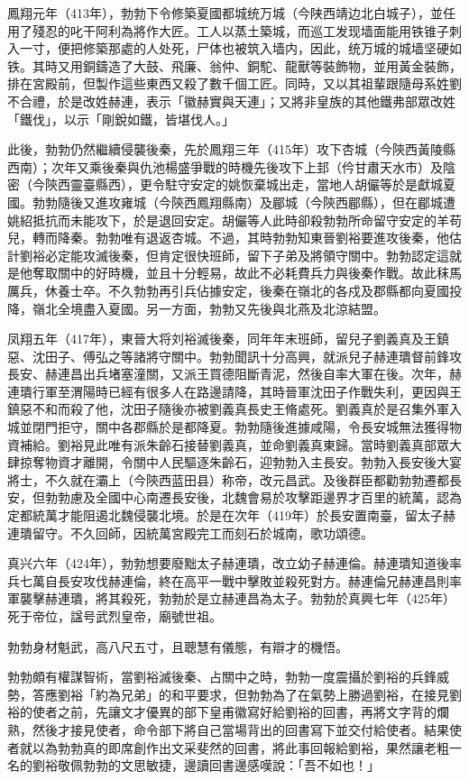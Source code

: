 鳳翔元年（413年），勃勃下令修築夏國都城统万城（今陕西靖边北白城子），並任用了殘忍的叱干阿利為將作大匠。工人以蒸土築城，而巡工发现墙面能用铁锥子刺入一寸，便把修築那處的人处死，尸体也被筑入墙内，因此，统万城的城墙坚硬如铁。其時又用銅鑄造了大鼓、飛廉、翁仲、銅駝、龍獸等裝飾物，並用黃金裝飾，排在宮殿前，但製作這些東西又殺了數千個工匠。同時，又以其祖輩跟隨母系姓劉不合禮，於是改姓赫連，表示「徽赫實與天連」；又將非皇族的其他鐵弗部眾改姓「鐵伐」，以示「剛銳如鐵，皆堪伐人。」

此後，勃勃仍然繼續侵襲後秦，先於鳳翔三年（415年）攻下杏城（今陝西黃陵縣西南）；次年又乘後秦與仇池楊盛爭戰的時機先後攻下上邽（仱甘肅天水市）及陰密（今陝西靈臺縣西），更令駐守安定的姚恢棄城出走，當地人胡儼等於是獻城夏國。勃勃隨後又進攻雍城（今陝西鳳翔縣南）及郿城（今陝西郿縣），但在郿城遭姚紹抵抗而未能攻下，於是退回安定。胡儼等人此時卻殺勃勃所命留守安定的羊苟兒，轉而降秦。勃勃唯有退返杏城。不過，其時勃勃知東晉劉裕要進攻後秦，他估計劉裕必定能攻滅後秦，但肯定很快班師，留下子弟及將領守關中。勃勃認定這就是他奪取關中的好時機，並且十分輕易，故此不必耗費兵力與後秦作戰。故此秣馬厲兵，休養士卒。不久勃勃再引兵佔據安定，後秦在嶺北的各戍及郡縣都向夏國投降，嶺北全境盡入夏國。另一方面，勃勃又先後與北燕及北涼結盟。

凤翔五年（417年），東晉大将刘裕滅後秦，同年年末班師，留兒子劉義真及王鎮惡、沈田子、傅弘之等諸將守關中。勃勃聞訊十分高興，就派兒子赫連璝督前鋒攻長安、赫連昌出兵堵塞潼關，又派王買德阻斷青泥，然後自率大軍在後。次年，赫連璝行軍至渭陽時已經有很多人在路邊請降，其時晉軍沈田子作戰失利，更因與王鎮惡不和而殺了他，沈田子隨後亦被劉義真長史王脩處死。劉義真於是召集外軍入城並閉門拒守，關中各郡縣於是都降夏。勃勃隨後進據咸陽，令長安城無法獲得物資補給。劉裕見此唯有派朱齡石接替劉義真，並命劉義真東歸。當時劉義真部眾大肆掠奪物資才離開，令關中人民驅逐朱齡石，迎勃勃入主長安。勃勃入長安後大宴將士，不久就在灞上（今陝西蓝田县）称帝，改元昌武。及後群臣都勸勃勃遷都長安，但勃勃慮及全國中心南遷長安後，北魏會易於攻擊距邊界才百里的統萬，認為定都統萬才能阻遏北魏侵襲北境。於是在次年（419年）於長安置南臺，留太子赫連璝留守。不久回師，因統萬宮殿完工而刻石於城南，歌功頌德。

真兴六年（424年），勃勃想要廢黜太子赫連璝，改立幼子赫連倫。赫連璝知道後率兵七萬自長安攻伐赫連倫，終在高平一戰中擊敗並殺死對方。赫連倫兄赫連昌則率軍襲擊赫連璝，將其殺死，勃勃於是立赫連昌為太子。勃勃於真興七年（425年）死于帝位，諡号武烈皇帝，廟號世祖。

勃勃身材魁武，高八尺五寸，且聰慧有儀態，有辯才的機悟。

勃勃頗有權謀智術，當劉裕滅後秦、占關中之時，勃勃一度震攝於劉裕的兵鋒威勢，答應劉裕「約為兄弟」的和平要求，但勃勃為了在氣勢上勝過劉裕，在接見劉裕的使者之前，先讓文才優異的部下皇甫徽寫好給劉裕的回書，再將文字背的爛熟，然後才接見使者，命令部下將自己當場背出的回書寫下並交付給使者。結果使者就以為勃勃真的即席創作出文采斐然的回書，將此事回報給劉裕，果然讓老粗一名的劉裕敬佩勃勃的文思敏捷，邊讀回書邊感嘆說：「吾不如也！」

